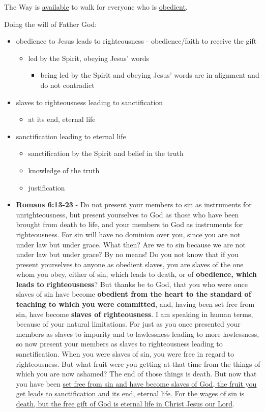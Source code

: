 \documentclass[11pt]{article}
\begin{document}
The Way is \uline{available} to walk for everyone who is \uline{obedient}.

Doing the will of Father God:
\begin{itemize}
\item obedience to Jesus leads to righteousness - obedience/faith to receive the gift
\begin{itemize}
\item led by the Spirit, obeying Jesus' words
\begin{itemize}
\item being led by the Spirit and obeying Jesus' words are in alignment and do not contradict
\end{itemize}
\end{itemize}
\item slaves to righteousness leading to sanctification
\begin{itemize}
\item at its end, eternal life
\end{itemize}
\item sanctification leading to eternal life
\begin{itemize}
\item sanctification by the Spirit and belief in the truth
\item knowledge of the truth
\item justification
\end{itemize}

\item \textbf{Romans 6:13-23} - Do not present your members to sin as instruments for unrighteousness, but present yourselves to God as those who have been brought from death to life, and your members to God as instruments for righteousness.  For sin will have no dominion over you, since you are not under law but under grace.  What then? Are we to sin because we are not under law but under grace? By no means!  Do you not know that if you present yourselves to anyone as obedient slaves, you are slaves of the one whom you obey, either of sin, which leads to death, or of \textbf{obedience, which leads to righteousness}?  But thanks be to God, that you who were once slaves of sin have become \textbf{obedient from the heart to the standard of teaching to which you were committed}, and, having been set free from sin, have become \textbf{slaves of righteousness}.  I am speaking in human terms, because of your natural limitations. For just as you once presented your members as slaves to impurity and to lawlessness leading to more lawlessness, so now present your members as slaves to righteousness leading to sanctification.  When you were slaves of sin, you were free in regard to righteousness.  But what fruit were you getting at that time from the things of which you are now ashamed? The end of those things is death.  But now that you have been \uline{set free from sin and have become slaves of God, the fruit you get leads to sanctification and its end, eternal life.  For the wages of sin is death, but the free gift of God is eternal life in Christ Jesus our Lord}.
\end{itemize}
\end{document}
